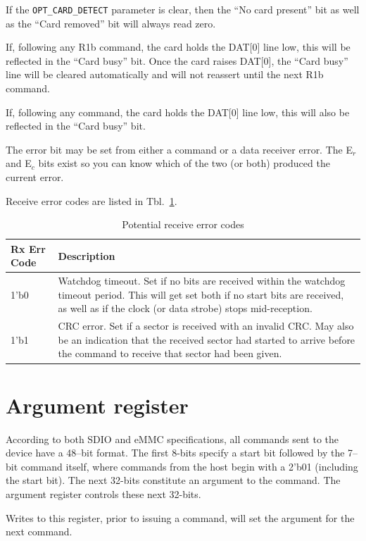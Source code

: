 \documentclass{gqtekspec}
\begin{document}
If the {\tt OPT\_CARD\_DETECT} parameter is clear, then the ``No card present''
bit as well as the ``Card removed'' bit will always read zero.

If, following any R1b command, the card holds the DAT[0] line low, this will be
reflected in the ``Card busy'' bit.  Once the card raises DAT[0], the
``Card busy'' line will be cleared automatically and will not reassert until
the next R1b command.

If, following any command, the card holds the DAT[0] line low, this will also
be reflected in the ``Card busy'' bit.

The error bit may be set from either a command or a data receiver error.
The E$_r$ and E$_c$ bits exist so you can know which of the two (or both)
produced the current error.

Receive error codes are listed in Tbl.~\ref{tbl:CMD-RXECODE}.
\begin{table}\begin{center}
\begin{tabular}{|p{1.2in}|p{4.0in}|}\hline
	\rowcolor[gray]{0.85} Rx Err Code & Description\\\hline\hline
1'b0 & Watchdog timeout.  Set if no bits are received within the watchdog
	timeout period.  This will get set both if no start bits are received,
	as well as if the clock (or data strobe) stops mid-reception. \\
1'b1 & CRC error.  Set if a sector is received with an invalid CRC.  May also
	be an indication that the received sector had started to arrive before
	the command to receive that sector had been given.
	\\\hline
\end{tabular}
\caption{Potential receive error codes}\label{tbl:CMD-RXECODE}
\end{center}\end{table}

\section{Argument register}
According to both SDIO and eMMC specifications, all commands sent to the
device have a 48--bit format.  The first 8-bits specify a start bit followed
by the 7--bit command itself, where commands from the host begin with a
2'b01 (including the start bit).  The next 32-bits constitute an argument
to the command.  The argument register controls these next 32-bits.

Writes to this register, prior to issuing a command, will set the argument
for the next command.
\end{document}
